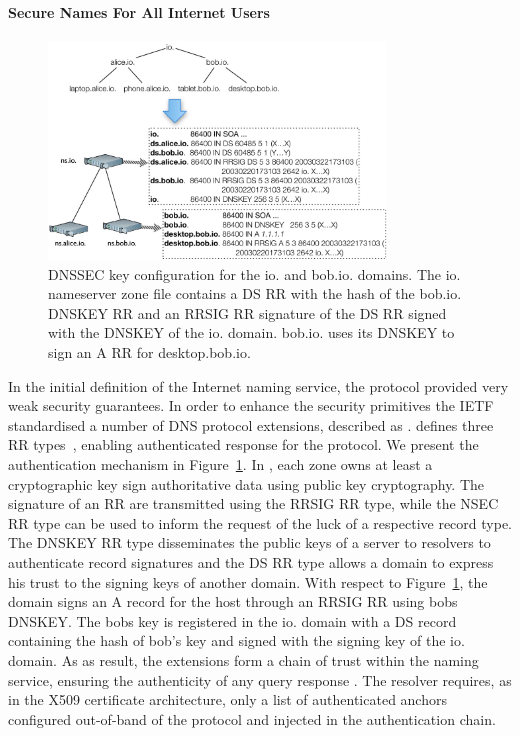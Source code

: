 \paragraph{Secure Names For All Internet Users}

\begin{figure}
  \centering
    \includegraphics[width=0.8\textwidth]{DNSSEC_hierarchy}
    \caption{DNSSEC key configuration for the io. and bob.io. domains. The io.
      nameserver zone file contains a DS RR with the hash of the bob.io. DNSKEY
      RR and an RRSIG RR signature of the DS RR signed with the DNSKEY of the
      io. domain. bob.io. uses its DNSKEY to sign an A RR for desktop.bob.io.}
  \label{fig:dnssec_hierarchy}
\end{figure}

In the initial definition of the Internet naming service, the protocol provided
very weak security guarantees. In order to enhance the security primitives the
IETF standardised a number of DNS protocol extensions, described as \dnssec.
\dnssec defines three RR types~\cite{RFC4034}, enabling authenticated response
for the protocol. We present the authentication mechanism in
Figure~\ref{fig:dnssec_hierarchy}. In \dnssec, each zone owns at least a
cryptographic key  sign authoritative data using public key cryptography.  The
signature of an RR are transmitted using the RRSIG RR type, while the NSEC RR
type can be used to inform the request of the luck of a respective record type.
The DNSKEY RR type disseminates the public keys of a server to resolvers to
authenticate record signatures and the DS RR type allows a domain to express his
trust to the signing keys of another domain. With respect to
Figure~\ref{fig:dnssec_hierarchy}, the domain  signs an A record for
the host  through an RRSIG RR using bobs DNSKEY. The bobs key is
registered in the  io. domain with a DS record containing the hash of bob's key
and signed with the signing key of the io. domain. 
  As as result, the \dnssec
extensions form a chain of trust within the naming service, ensuring the
authenticity of any query response . The resolver requires, as in the X509
certificate architecture, only a list of authenticated anchors configured
out-of-band of the protocol and injected in the authentication chain.

